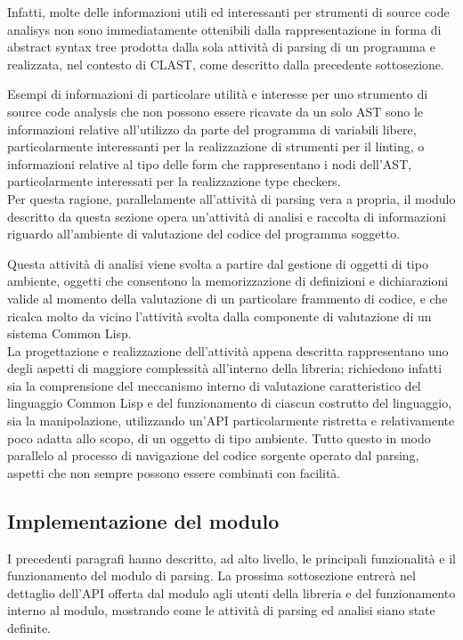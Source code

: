 Infatti, molte delle informazioni utili ed interessanti per strumenti di source
code analisys non sono immediatamente ottenibili dalla rappresentazione in forma
di abstract syntax tree prodotta dalla sola attività di parsing di un programma
e realizzata, nel contesto di CLAST, come descritto dalla precedente
sottosezione.

Esempi di informazioni di particolare utilità e interesse per uno strumento di
source code analysis che non possono essere ricavate da un solo AST sono le
informazioni relative all'utilizzo da parte del programma di variabili libere,
particolarmente interessanti per la realizzazione di strumenti per il linting, o
informazioni relative al tipo delle form che rappresentano i nodi dell'AST,
particolarmente interessati per la realizzazione type checkers.\\

Per questa ragione, parallelamente all'attività di parsing vera a propria, il
modulo descritto da questa sezione opera un'attività di analisi e raccolta di
informazioni riguardo all'ambiente di valutazione del codice del programma
soggetto.

Questa attività di analisi viene svolta a partire dal gestione di oggetti di
tipo ambiente, oggetti che consentono la memorizzazione di definizioni e
dichiarazioni valide al momento della valutazione di un particolare frammento di
codice, e che ricalca molto da vicino l’attività svolta dalla componente di
valutazione di un sistema Common Lisp.\\

La progettazione e realizzazione dell'attività appena descritta rappresentano
uno degli aspetti di maggiore complessità all'interno della libreria; richiedono
infatti sia la comprensione del meccanismo interno di valutazione caratteristico
del linguaggio Common Lisp e del funzionamento di ciascun costrutto del
linguaggio, sia la manipolazione, utilizzando un'API particolarmente ristretta e
relativamente poco adatta allo scopo, di un oggetto di tipo ambiente. Tutto
questo in modo parallelo al processo di navigazione del codice sorgente operato
dal parsing, aspetti che non sempre possono essere combinati con facilità.

\subsection{Implementazione del modulo}

I precedenti paragrafi hanno descritto, ad alto livello, le principali
funzionalità e il funzionamento del modulo di parsing. La prossima sottosezione
entrerà nel dettaglio dell'API offerta dal modulo agli utenti della libreria e
del funzionamento interno al modulo, mostrando come le attività di parsing ed
analisi siano state definite.

